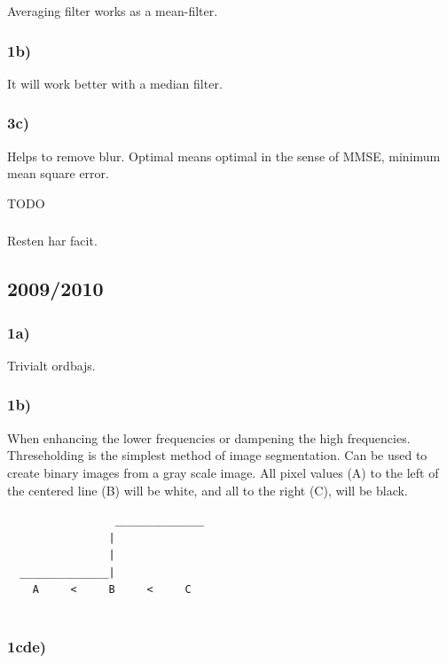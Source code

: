 \documentclass[12pt]{article}
\begin{document}
        Averaging filter works as a mean-filter.
        
    \subsubsection*{1b)}
        
        It will work better with a median filter.
        
    \subsubsection*{3c)}

        Helps to remove blur. Optimal means optimal in the sense of MMSE, minimum mean square error.
        
        TODO

    \subsubsection*{}
    
        Resten har facit. 
        
\subsection{2009/2010}

    \subsubsection*{1a)}
    
        Trivialt ordbajs.
    
    \subsubsection*{1b)}
    
        When enhancing the lower frequencies or dampening the high frequencies. Threseholding is the simplest
        method of image segmentation. Can be used to create binary images from a gray scale image. 
        All pixel values (A) to the left of the centered line (B) will be white, and all to the right (C), will be black.
        \begin{verbatim}
                 ______________
                |
                |
  ______________|
    A     <     B     <     C
            
        \end{verbatim}

    \subsubsection*{1cde)}
    
\end{document}
